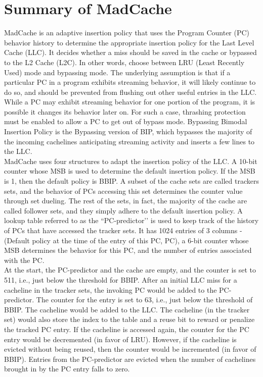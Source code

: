 \documentclass[11pt, swedish, openany]{book}
\begin{document}
\section{Summary of MadCache}
MadCache is an adaptive insertion policy that uses the Program Counter (PC) behavior history to determine the appropriate insertion policy for the Last Level Cache (LLC). It decides whether a miss should be saved in the cache or bypassed to the L2 Cache (L2C). In other words, choose between LRU (Least Recently Used) mode and bypassing mode.
The underlying assumption is that if a particular PC in a program exhibits streaming behavior, it will likely continue to do so, and should be prevented from flushing out other useful entries in the LLC.
While a PC may exhibit streaming behavior for one portion of the program, it is possible it changes its behavior later on. For such a case, thrashing protection must be enabled to allow a PC to get out of bypass mode.
Bypassing Bimodal Insertion Policy is the Bypassing version of BIP, which bypasses the majority of the incoming cachelines anticipating streaming activity and inserts a few lines to the LLC. \\

MadCache uses four structures to adapt the insertion policy of the LLC.
A 10-bit counter whose MSB is used to determine the default insertion policy. If the MSB is 1, then the default policy is BBIP.
A subset of the cache sets are called trackers sets, and the behavior of PCs accessing this set determines the counter value through set dueling.
The rest of the sets, in fact, the majority of the cache are called follower sets, and they simply adhere to the default insertion policy.
A lookup table referred to as the ``PC-predictor’’ is used to keep track of the history of PCs that have accessed the tracker sets. It has 1024 entries of 3 columns - (Default policy at the time of the entry of this PC, PC), a 6-bit counter whose MSB determines the behavior for this PC, and the number of entries associated with the PC. \\

At the start, the PC-predictor and the cache are empty, and the counter is set to 511, i.e., just below the threshold for BBIP.
After an initial LLC miss for a cacheline in the tracker sets, the invoking PC would be added to the PC-predictor. The counter for the entry is set to 63, i.e., just below the threshold of BBIP. The cacheline would be added to the LLC. The cacheline (in the tracker set) would also store the index to the table and a reuse bit to reward or penalize the tracked PC entry.
If the cacheline is accessed again, the counter for the PC entry would be decremented (in favor of LRU). However, if the cacheline is evicted without being reused, then the counter would be incremented (in favor of BBIP).
Entries from the PC-predictor are evicted when the number of cachelines brought in by the PC entry falls to zero.
\end{document}
